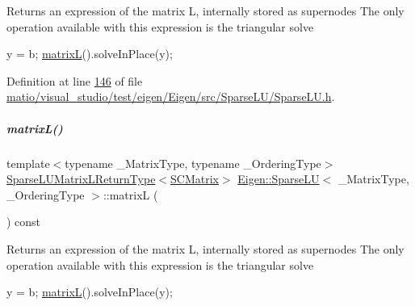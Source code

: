 \begin{DoxyReturn}{Returns}
an expression of the matrix L, internally stored as supernodes The only operation available with this expression is the triangular solve 
\begin{DoxyCode}
y = b; \hyperlink{group___sparse_l_u___module_a634abe55e5a076f2e10db78871105a8f}{matrixL}().solveInPlace(y);
\end{DoxyCode}
 
\end{DoxyReturn}


Definition at line \hyperlink{matio_2visual__studio_2test_2eigen_2_eigen_2src_2_sparse_l_u_2_sparse_l_u_8h_source_l00146}{146} of file \hyperlink{matio_2visual__studio_2test_2eigen_2_eigen_2src_2_sparse_l_u_2_sparse_l_u_8h_source}{matio/visual\+\_\+studio/test/eigen/\+Eigen/src/\+Sparse\+L\+U/\+Sparse\+L\+U.\+h}.

\mbox{\label{group___sparse_l_u___module_a634abe55e5a076f2e10db78871105a8f}} 
\subparagraph{\texorpdfstring{matrix\+L()}{matrixL()}\hspace{0.1cm}{\footnotesize\ttfamily [2/2]}}
{\footnotesize\ttfamily template$<$typename \+\_\+\+Matrix\+Type, typename \+\_\+\+Ordering\+Type$>$ \\
\hyperlink{struct_eigen_1_1_sparse_l_u_matrix_l_return_type}{Sparse\+L\+U\+Matrix\+L\+Return\+Type}$<$\hyperlink{group___sparse_l_u___module}{S\+C\+Matrix}$>$ \hyperlink{group___sparse_l_u___module_class_eigen_1_1_sparse_l_u}{Eigen\+::\+Sparse\+LU}$<$ \+\_\+\+Matrix\+Type, \+\_\+\+Ordering\+Type $>$\+::matrixL (\begin{DoxyParamCaption}{ }\end{DoxyParamCaption}) const\hspace{0.3cm}{\ttfamily [inline]}}

\begin{DoxyReturn}{Returns}
an expression of the matrix L, internally stored as supernodes The only operation available with this expression is the triangular solve 
\begin{DoxyCode}
y = b; \hyperlink{group___sparse_l_u___module_a634abe55e5a076f2e10db78871105a8f}{matrixL}().solveInPlace(y);
\end{DoxyCode}
 
\end{DoxyReturn}


